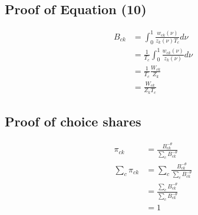 \documentclass[10pt]{article}
\begin{document}
\subsection{Proof of Equation (10)}

\begin{align*}
    B_{ck} & = \int_{0}^{1} \frac{w_{ck}(\nu)}{z_k(\nu) T_c} d\nu           \\
           & = \frac{1}{T_c} \int_{0}^{1} \frac{w_{ck}(\nu)}{z_k(\nu)} d\nu \\
           & = \frac{1}{T_c} \frac{W_{ck}}{Z_k}                             \\
           & = \frac{W_{ck}}{Z_k T_c}
\end{align*}

\subsection{Proof of choice shares}

\begin{align*}
    \pi_{ck}             & = \frac{B_{ck}^{- \theta}}{\sum_{c}^{} B_{ck}^{- \theta}}             \\
    \sum_{c}^{} \pi_{ck} & = \sum_{c}^{} \frac{B_{ck}^{- \theta}}{\sum_{c}^{} B_{ck}^{- \theta}} \\
                         & = \frac{\sum_{c}^{} B_{ck}^{- \theta}}{\sum_{c}^{} B_{ck}^{- \theta}} \\
                         & = 1
\end{align*}
\end{document}
